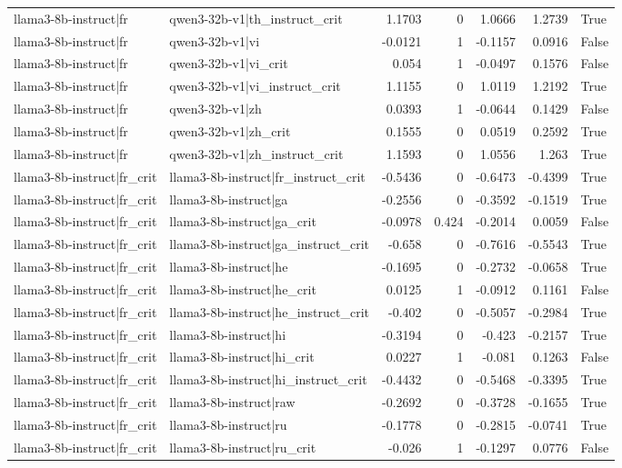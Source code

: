 \begin{table}
\begin{tabular}{l l r r r r l}
llama3-8b-instruct|fr & qwen3-32b-v1|th_instruct_crit & 1.1703 & 0 & 1.0666 & 1.2739 & True \\
llama3-8b-instruct|fr & qwen3-32b-v1|vi & -0.0121 & 1 & -0.1157 & 0.0916 & False \\
llama3-8b-instruct|fr & qwen3-32b-v1|vi_crit & 0.054 & 1 & -0.0497 & 0.1576 & False \\
llama3-8b-instruct|fr & qwen3-32b-v1|vi_instruct_crit & 1.1155 & 0 & 1.0119 & 1.2192 & True \\
llama3-8b-instruct|fr & qwen3-32b-v1|zh & 0.0393 & 1 & -0.0644 & 0.1429 & False \\
llama3-8b-instruct|fr & qwen3-32b-v1|zh_crit & 0.1555 & 0 & 0.0519 & 0.2592 & True \\
llama3-8b-instruct|fr & qwen3-32b-v1|zh_instruct_crit & 1.1593 & 0 & 1.0556 & 1.263 & True \\
llama3-8b-instruct|fr_crit & llama3-8b-instruct|fr_instruct_crit & -0.5436 & 0 & -0.6473 & -0.4399 & True \\
llama3-8b-instruct|fr_crit & llama3-8b-instruct|ga & -0.2556 & 0 & -0.3592 & -0.1519 & True \\
llama3-8b-instruct|fr_crit & llama3-8b-instruct|ga_crit & -0.0978 & 0.424 & -0.2014 & 0.0059 & False \\
llama3-8b-instruct|fr_crit & llama3-8b-instruct|ga_instruct_crit & -0.658 & 0 & -0.7616 & -0.5543 & True \\
llama3-8b-instruct|fr_crit & llama3-8b-instruct|he & -0.1695 & 0 & -0.2732 & -0.0658 & True \\
llama3-8b-instruct|fr_crit & llama3-8b-instruct|he_crit & 0.0125 & 1 & -0.0912 & 0.1161 & False \\
llama3-8b-instruct|fr_crit & llama3-8b-instruct|he_instruct_crit & -0.402 & 0 & -0.5057 & -0.2984 & True \\
llama3-8b-instruct|fr_crit & llama3-8b-instruct|hi & -0.3194 & 0 & -0.423 & -0.2157 & True \\
llama3-8b-instruct|fr_crit & llama3-8b-instruct|hi_crit & 0.0227 & 1 & -0.081 & 0.1263 & False \\
llama3-8b-instruct|fr_crit & llama3-8b-instruct|hi_instruct_crit & -0.4432 & 0 & -0.5468 & -0.3395 & True \\
llama3-8b-instruct|fr_crit & llama3-8b-instruct|raw & -0.2692 & 0 & -0.3728 & -0.1655 & True \\
llama3-8b-instruct|fr_crit & llama3-8b-instruct|ru & -0.1778 & 0 & -0.2815 & -0.0741 & True \\
llama3-8b-instruct|fr_crit & llama3-8b-instruct|ru_crit & -0.026 & 1 & -0.1297 & 0.0776 & False \\

\end{tabular}
\end{table}
